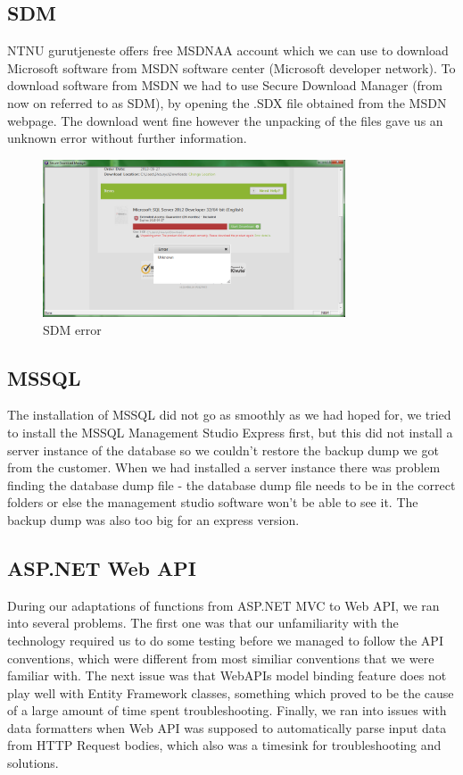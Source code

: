\subsection{SDM}
NTNU gurutjeneste offers free MSDNAA account which we can use to download Microsoft software from MSDN software center (Microsoft developer network). To download software from MSDN we had to use Secure Download Manager (from now on referred to as SDM), by opening the .SDX file obtained from the MSDN webpage. The download went fine however the unpacking of the files gave us an unknown error without further information.
\begin{figure}[H]
\centering
\includegraphics[width=0.8\textwidth]{images/issue00.png}
\caption{SDM error}
\label{fig:SDM_error}
\end{figure}

\subsection{MSSQL}
The installation of MSSQL did not go as smoothly as we had hoped for, we tried to install the MSSQL Management Studio Express first, but this did not install a server instance of the database so we couldn't restore the backup dump we got from the customer. When we had installed a server instance there was problem finding the database dump file - the database dump file needs to be in the correct folders or else the management studio software won't be able to see it. The backup dump was also too big for an express version.

\subsection{ASP.NET Web API}
\label{subsubsec:webapiissues}
During our adaptations of functions from ASP.NET MVC to Web API, we ran into several problems. The first one was that our unfamiliarity with the technology required us to do some testing before we managed to follow the API conventions, which were different from most similiar conventions that we were familiar with.
The next issue was that WebAPIs model binding feature does not play well with Entity Framework classes, something which proved to be the cause of a large amount of time spent troubleshooting.
Finally, we ran into issues with data formatters when Web API was supposed to automatically parse input data from HTTP Request bodies, which also was a timesink for troubleshooting and solutions.

